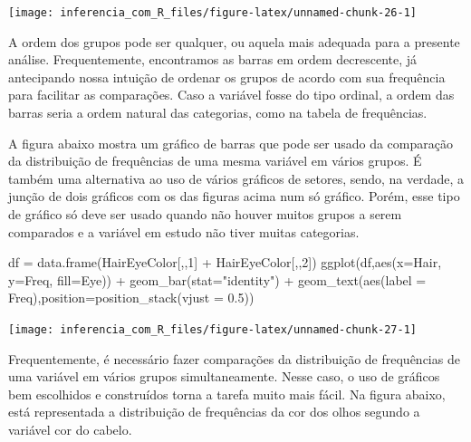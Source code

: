 \documentclass[
]{book}
\newenvironment{Shaded}{\begin{snugshade}}{\end{snugshade}}
\newcommand{\AttributeTok}[1]{\textcolor[rgb]{0.77,0.63,0.00}{#1}}
\newcommand{\DecValTok}[1]{\textcolor[rgb]{0.00,0.00,0.81}{#1}}
\newcommand{\FloatTok}[1]{\textcolor[rgb]{0.00,0.00,0.81}{#1}}
\newcommand{\FunctionTok}[1]{\textcolor[rgb]{0.00,0.00,0.00}{#1}}
\newcommand{\NormalTok}[1]{#1}
\newcommand{\OtherTok}[1]{\textcolor[rgb]{0.56,0.35,0.01}{#1}}
\newcommand{\SpecialCharTok}[1]{\textcolor[rgb]{0.00,0.00,0.00}{#1}}
\newcommand{\StringTok}[1]{\textcolor[rgb]{0.31,0.60,0.02}{#1}}
\begin{document}
\begin{center}\texttt{[image: inferencia\_com\_R\_files/figure-latex/unnamed-chunk-26-1]} \end{center}

A ordem dos grupos pode ser qualquer, ou aquela mais adequada para a presente análise. Frequentemente, encontramos as barras em ordem decrescente, já antecipando nossa intuição de ordenar os grupos de acordo com sua frequência para facilitar as comparações. Caso a variável fosse do tipo ordinal, a ordem das barras seria a ordem natural das categorias, como na tabela de frequências.

A figura abaixo mostra um gráfico de barras que pode ser usado da comparação da distribuição de frequências de uma mesma variável em vários grupos. É também uma alternativa ao uso de vários gráficos de setores, sendo, na verdade, a junção de dois gráficos com os das figuras acima num só gráfico. Porém, esse tipo de gráfico só deve ser usado quando não houver muitos grupos a serem comparados e a variável em estudo não tiver muitas categorias.

\begin{Shaded}
\begin{Highlighting}[]
\NormalTok{df }\OtherTok{=} \FunctionTok{data.frame}\NormalTok{(HairEyeColor[,,}\DecValTok{1}\NormalTok{] }\SpecialCharTok{+}\NormalTok{ HairEyeColor[,,}\DecValTok{2}\NormalTok{])}
\FunctionTok{ggplot}\NormalTok{(df,}\FunctionTok{aes}\NormalTok{(}\AttributeTok{x=}\NormalTok{Hair, }\AttributeTok{y=}\NormalTok{Freq, }\AttributeTok{fill=}\NormalTok{Eye)) }\SpecialCharTok{+}
  \FunctionTok{geom\_bar}\NormalTok{(}\AttributeTok{stat=}\StringTok{"identity"}\NormalTok{) }\SpecialCharTok{+}
  \FunctionTok{geom\_text}\NormalTok{(}\FunctionTok{aes}\NormalTok{(}\AttributeTok{label =}\NormalTok{ Freq),}\AttributeTok{position=}\FunctionTok{position\_stack}\NormalTok{(}\AttributeTok{vjust =} \FloatTok{0.5}\NormalTok{))}
\end{Highlighting}
\end{Shaded}

\begin{center}\texttt{[image: inferencia\_com\_R\_files/figure-latex/unnamed-chunk-27-1]} \end{center}

Frequentemente, é necessário fazer comparações da distribuição de frequências de uma variável em vários grupos simultaneamente. Nesse caso, o uso de gráficos bem escolhidos e construídos torna a tarefa muito mais fácil. Na figura abaixo, está representada a distribuição de frequências da cor dos olhos segundo a variável cor do cabelo.
\end{document}
